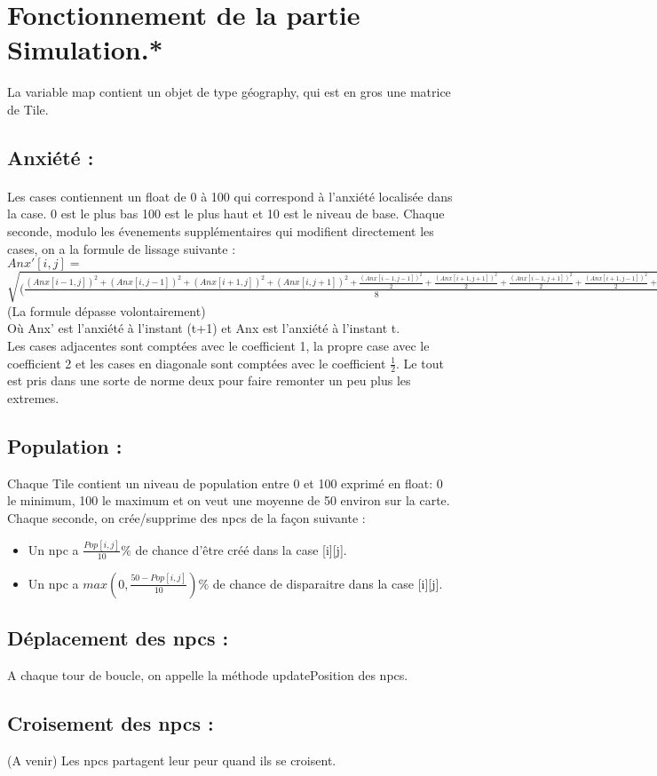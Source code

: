\documentclass[a4paper]{article}
\begin{document}
\section*{Fonctionnement de la partie Simulation.*}

La variable map contient un objet de type géography, qui est en gros une matrice de Tile.

\subsection*{Anxiété :}
\paragraph{} Les cases contiennent un float de 0 à 100 qui correspond à l'anxiété localisée dans la case. 0 est le plus bas 100 est le plus haut et 10 est le niveau de base.
Chaque seconde, modulo les évenements supplémentaires qui modifient directement les cases, on a la formule de lissage suivante :\\
$Anx'[i,j]=$\\
$\sqrt{(\frac{(Anx[i-1,j])^2+(Anx[i,j-1])^2+(Anx[i+1,j])^2+(Anx[i,j+1])^2+\frac{(Anx[i-1,j-1])^2}{2}+\frac{(Anx[i+1,j+1])^2}{2}+\frac{(Anx[i-1,j+1])^2}{2}+\frac{(Anx[i+1,j-1])^2}{2}+2*(Anx[i,j])^2}{8}}$
(La formule dépasse volontairement)\\
Où Anx' est l'anxiété à l'instant (t+1) et Anx est l'anxiété à l'instant t.\\
Les cases adjacentes sont comptées avec le coefficient 1, la propre case avec le coefficient 2 et les cases en diagonale sont comptées avec le coefficient $\frac{1}{2}$. Le tout est pris dans une sorte de norme deux pour faire remonter un peu plus les extremes.

\subsection*{Population :}
Chaque Tile contient un niveau de population entre 0 et 100 exprimé en float: 0 le minimum, 100 le maximum et on veut une moyenne de 50 environ sur la carte.
Chaque seconde, on crée/supprime des npcs de la façon suivante :
\begin{itemize}
\item Un npc a $\frac{Pop[i,j]}{10}\%$ de chance d'être créé dans la case [i][j].
\item Un npc a $max(0,\frac{50-Pop[i,j]}{10})\%$ de chance de disparaitre dans la case [i][j].
\end{itemize}

\subsection*{Déplacement des npcs :}
A chaque tour de boucle, on appelle la méthode updatePosition des npcs.

\subsection*{Croisement des npcs :}
(A venir) Les npcs partagent leur peur quand ils se croisent.
\end{document}
